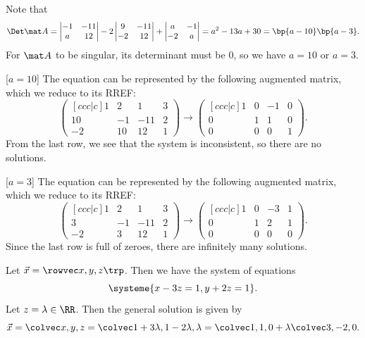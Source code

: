\begin{solution}
    Note that \[\Det \mat A = \begin{vmatrix}-1 & -11 \\ a & 12\end{vmatrix} - 2 \begin{vmatrix}9 & -11 \\ -2 & 12\end{vmatrix} + \begin{vmatrix}a & -1 \\ -2 & a\end{vmatrix} = a^2 - 13 a + 30 = \bp{a-10}\bp{a-3}.\] For $\mat A$ to be singular, its determinant must be 0, so we have $a = 10$ or $a = 3$.

    [$a = 10$] The equation can be represented by the following augmented matrix, which we reduce to its RREF: \[\begin{pmatrix}[ccc|c] 1 & 2 & 1 & 3 \\ 10 & -1 & -11 & 2 \\ -2 & 10 & 12 & 1\end{pmatrix} \rightarrow \begin{pmatrix}[ccc|c]1 & 0 & -1 & 0 \\ 0 & 1 & 1 & 0 \\ 0 & 0 & 0 & 1\end{pmatrix}.\] From the last row, we see that the system is inconsistent, so there are no solutions.

    [$a = 3$] The equation can be represented by the following augmented matrix, which we reduce to its RREF: \[\begin{pmatrix}[ccc|c] 1 & 2 & 1 & 3 \\ 3 & -1 & -11 & 2 \\ -2 & 3 & 12 & 1\end{pmatrix} \rightarrow \begin{pmatrix}[ccc|c]1 & 0 & -3 & 1 \\ 0 & 1 & 2 & 1 \\ 0 & 0 & 0 & 0\end{pmatrix}.\] Since the last row is full of zeroes, there are infinitely many solutions.

    Let $\vec x = \cveciiix{x}{y}{z}$. Then we have the system of equations \[\systeme{x-3z=1,y+2z=1}.\] Let $z = \l \in \RR$. Then the general solution is given by \[\vec x = \cveciii{x}{y}{z} = \cveciii{1 + 3\l}{1 - 2\l}{\l} = \cveciii110 + \l \cveciii{3}{-2}0.\]
\end{solution}

